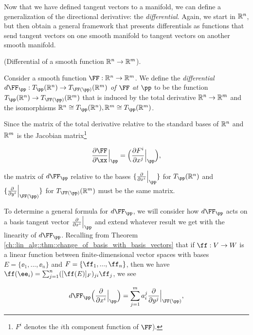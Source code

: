 Now that we have defined tangent vectors to a manifold, we can define a generalization of the directional derivative: the \textit{differential}. Again, we start in $\mathbb{R}^n$, but then obtain a general framework that presents differentials as functions that send tangent vectors on one smooth manifold to tangent vectors on another smooth manifold.

\begin{defn}
\label{ch::manifolds::defn::differential_smooth_function_Rn_Rm}
    (Differential of a smooth function $\mathbb{R}^n \rightarrow \mathbb{R}^m$).

    Consider a smooth function $\FF:\R^n \rightarrow \R^m$. We define the \textit{differential $d\FF_\pp:T_\pp(\R^n) \rightarrow T_{\FF(\pp)}(\R^m)$ of $\FF$ at $\pp$} to be the function $T_\pp(\R^n) \rightarrow T_{\FF(\pp)}(\R^m)$ that is induced by the total derivative $\mathbb{R}^n \rightarrow \mathbb{R}^m$ and the isomorphisms $\R^n \cong T_\pp(\R^n), \R^m \cong T_\pp(\R^m)$.
    
    Since the matrix of the total derivative relative to the standard bases of $\mathbb{R}^n$ and $\mathbb{R}^m$ is the Jacobian matrix\footnote{$F^i$ denotes the $i$th component function of $\FF$).}
    
    \begin{align*}
        \frac{\pd \FF}{\pd \xx}\Big|_\pp = \Big( \frac{\pd F^i}{\pd x^j}\Big|_\pp \Big),
    \end{align*}
    
    the matrix of $d\FF_\pp$ relative to the bases 
    $\{ \frac{\pd}{\pd x^i} \Big|_\pp \}$ for $T_\pp(\R^n)$ and $\{ \frac{\pd}{\pd y^i} \Big|_{\FF(\pp)} \}$ for $T_{\FF(\pp)}(\R^m)$ must be the same matrix.
    
    To determine a general formula for $d\FF_\pp$, we will consider how $d\FF_\pp$ acts on a basis tangent vector $\frac{\pd}{\pd x^i}\Big|_\pp$ and extend whatever result we get with the linearity of $d\FF_\pp$. Recalling from Theorem \ref{ch::lin_alg::thm::change_of_basis_with_basis_vectors} that if $\ff:V \rightarrow W$ is a linear function between finite-dimensional vector spaces with bases $E = \{\ee_1, ..., \ee_n\}$ and $F = \{\ff_1, ..., \ff_n\}$, then we have $\ff(\ee_i) = \sum_{j = 1}^n ([\ff(E)]_F)_{ji} \ff_j$, we see
    
    \begin{align*}
        d\FF_\pp \Big( \frac{\pd}{\pd x^i}\Big|_\pp \Big) 
        = \sum_{j = 1}^m a^j_i \frac{\pd}{\pd y^j}\Big|_{\FF(\pp)},
    \end{align*}
    

\end{defn}
